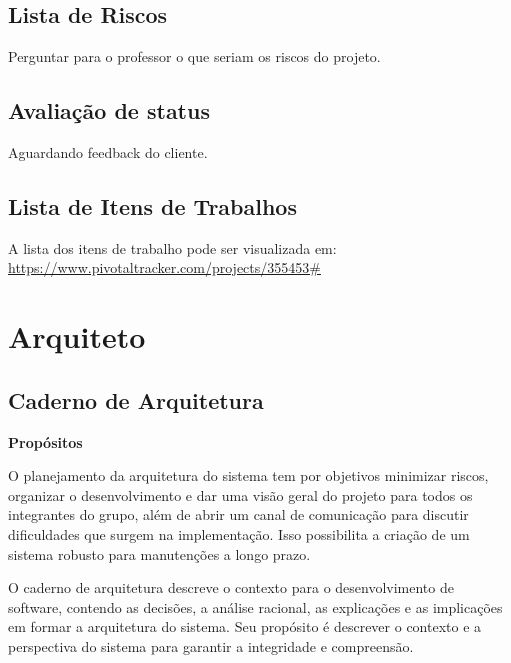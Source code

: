 \documentclass[12pt,letterpaper]{article}
\begin{document}
\pagebreak

\subsection{Lista de Riscos}

Perguntar para o professor o que seriam os riscos do projeto.

\pagebreak

\subsection{Avaliação de status}

Aguardando feedback do cliente.

\pagebreak

\subsection{Lista de Itens de Trabalhos}

A lista dos itens de trabalho pode ser visualizada em: \url{https://www.pivotaltracker.com/projects/355453#}

\pagebreak



\section{Arquiteto}

\subsection{Caderno de Arquitetura}

\vspace{1cm}
{\large {\bf Propósitos}}
\vspace{0.5cm}

O planejamento da arquitetura do sistema tem por objetivos minimizar riscos, organizar o desenvolvimento e
dar uma visão geral do projeto para todos os integrantes do grupo, além de abrir um canal de comunicação para discutir dificuldades que surgem na implementação. Isso possibilita a criação de um sistema robusto para manutenções a longo prazo.

O caderno de arquitetura descreve o contexto para o desenvolvimento de software, 
contendo as decisões, a análise racional, as explicações e as implicações em formar a 
arquitetura do sistema. Seu propósito é descrever o contexto e a perspectiva do sistema para 
garantir a integridade e compreensão.
\end{document}
